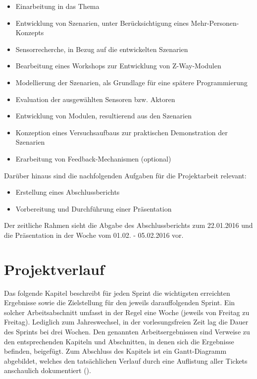 \documentclass[12pt, oneside, smallheadings]{scrbook}
\begin{document}
\begin{itemize}
\item Einarbeitung in das Thema
\item Entwicklung von Szenarien, unter Berücksichtigung eines Mehr-Personen-Konzepts
\item Sensorrecherche, in Bezug auf die entwickelten Szenarien
\item Bearbeitung eines Workshops zur Entwicklung von Z-Way-Modulen
\item Modellierung der Szenarien, als Grundlage für eine spätere Programmierung
\item Evaluation der ausgewählten Sensoren bzw. Aktoren
\item Entwicklung von Modulen, resultierend aus den Szenarien
\item Konzeption eines Versuchsaufbaus zur praktischen Demonstration der Szenarien
\item Erarbeitung von Feedback-Mechanismen (optional)\\
\end{itemize}
\noindent
Darüber hinaus sind die nachfolgenden Aufgaben für die Projektarbeit relevant:\\

\begin{itemize}
\item Erstellung eines Abschlussberichts
\item Vorbereitung und Durchführung einer Präsentation\\
\end{itemize}
\noindent
Der zeitliche Rahmen sieht die Abgabe des Abschlussberichts zum 22.01.2016 und die Präsentation in der Woche vom 01.02. - 05.02.2016 vor.

\chapter{Projektverlauf}

Das folgende Kapitel beschreibt für jeden Sprint die wichtigsten erreichten Ergebnisse sowie die Zielstellung für den jeweils darauffolgenden Sprint. Ein solcher Arbeitsabschnitt umfasst in der Regel eine Woche (jeweils von Freitag zu Freitag). Lediglich zum Jahreswechsel, in der vorlesungsfreien Zeit lag die Dauer des Sprints bei drei Wochen. Den genannten Arbeitsergebnissen sind Verweise zu den entsprechenden Kapiteln und Abschnitten, in denen sich die Ergebnisse befinden, beigefügt. Zum Abschluss des Kapitels ist ein Gantt-Diagramm abgebildet, welches den tatsächlichen Verlauf durch eine Auflistung aller Tickets anschaulich dokumentiert ().
\end{document}
